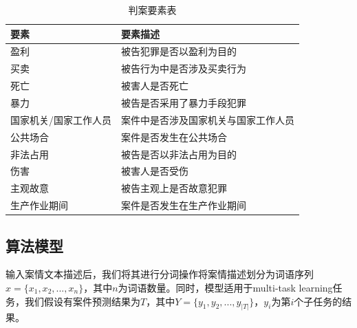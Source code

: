 \begin{table}[]
\center
\begin{tabular}{l|l}
\hline
\textbf{要素}          & \textbf{要素描述}   \\ \hline
盈利          & 被告犯罪是否以盈利为目的       \\
买卖          & 被告行为中是否涉及买卖行为      \\
死亡          & 被害人是否死亡            \\
暴力          & 被告是否采用了暴力手段犯罪      \\
国家机关/国家工作人员 & 案件中是否涉及国家机关与国家工作人员 \\
公共场合        & 案件是否发生在公共场合        \\
非法占用        & 被告是否以非法占用为目的       \\
伤害          & 被害人是否受伤            \\
主观故意        & 被告主观上是否故意犯罪        \\
生产作业期间      & 案件是否发生在生产作业期间  \\ \hline   
\end{tabular}
\label{tab:key_elements}
\caption{判案要素表}
\end{table}


\subsection{算法模型}
输入案情文本描述后，我们将其进行分词操作将案情描述划分为词语序列$x = \{x_{1}, x_{2}, ..., x_{n}\}$，其中$n$为词语数量。同时，模型适用于multi-task learning任务，我们假设有案件预测结果为$T$，其中$Y = \{y_{1}, y_{2}, ..., y_{|T|}\}$，$y_{i}$为第$i$个子任务的结果。

